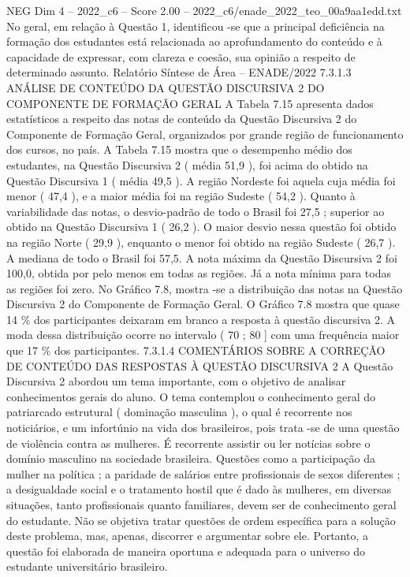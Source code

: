 \begin{textsample}{NEG Dim 4 – 2022\_c6 – Score 2.00 – 2022\_c6/enade\_2022\_teo\_00a9aa1edd.txt}
No geral, em relação à Questão 1, identificou -se que a principal deficiência na formação dos estudantes está relacionada ao aprofundamento do conteúdo e à capacidade de expressar, com clareza e coesão, sua opinião a respeito de determinado assunto.
Relatório Síntese de Área – ENADE/2022 7.3.1.3 ANÁLISE DE CONTEÚDO DA QUESTÃO DISCURSIVA 2 DO COMPONENTE DE FORMAÇÃO GERAL A Tabela 7.15 apresenta dados estatísticos a respeito das notas de conteúdo da Questão Discursiva 2 do Componente de Formação Geral, organizados por grande região de funcionamento dos cursos, no país.
A Tabela 7.15 mostra que o desempenho médio dos estudantes, na Questão Discursiva 2 ( média 51,9 ), foi acima do obtido na Questão Discursiva 1 ( média 49,5 ).
A região Nordeste foi aquela cuja média foi menor ( 47,4 ), e a maior média foi na região Sudeste ( 54,2 ).
Quanto à variabilidade das notas, o desvio-padrão de todo o Brasil foi 27,5 ; superior ao obtido na Questão Discursiva 1 ( 26,2 ).
O maior desvio nessa questão foi obtido na região Norte ( 29,9 ), enquanto o menor foi obtido na região Sudeste ( 26,7 ).
A mediana de todo o Brasil foi 57,5.
A nota máxima da Questão Discursiva 2 foi 100,0, obtida por pelo menos em todas as regiões.
Já a nota mínima para todas as regiões foi zero.
No Gráfico 7.8, mostra -se a distribuição das notas na Questão Discursiva 2 do Componente de Formação Geral.
O Gráfico 7.8 mostra que quase 14 \% dos participantes deixaram em branco a resposta à questão discursiva 2.
A moda dessa distribuição ocorre no intervalo ( 70 ; 80 ] com uma frequência maior que 17 \% dos participantes. 7.3.1.4 COMENTÁRIOS SOBRE A CORREÇÃO DE CONTEÚDO DAS RESPOSTAS À QUESTÃO DISCURSIVA 2 A Questão Discursiva 2 abordou um tema importante, com o objetivo de analisar conhecimentos gerais do aluno.
O tema contemplou o conhecimento geral do patriarcado estrutural ( dominação masculina ), o qual é recorrente nos noticiários, e um infortúnio na vida dos brasileiros, pois trata -se de uma questão de violência contra as mulheres.
É recorrente assistir ou ler notícias sobre o domínio masculino na sociedade brasileira.
Questões como a participação da mulher na política ; a paridade de salários entre profissionais de sexos diferentes ; a desigualdade social e o tratamento hostil que é dado às mulheres, em diversas situações, tanto profissionais quanto familiares, devem ser de conhecimento geral do estudante.
Não se objetiva tratar questões de ordem específica para a solução deste problema, mas, apenas, discorrer e argumentar sobre ele.
Portanto, a questão foi elaborada de maneira oportuna e adequada para o universo do estudante universitário brasileiro.

\end{textsample}
